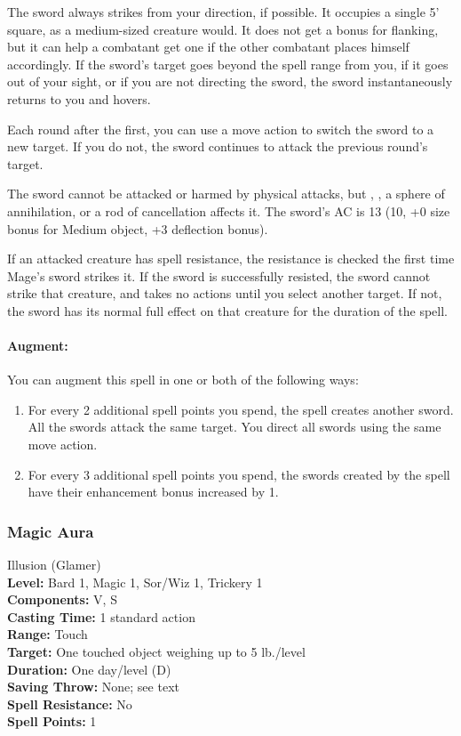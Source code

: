 The sword always strikes from your direction, if possible. It occupies a single 5' square, as a medium-sized creature would.
It does not get a bonus for flanking, but it can help a combatant get one if the other combatant places himself accordingly. 
If the sword's target goes beyond the spell range from you, if it goes out of your sight, 
or if you are not directing the sword, the sword instantaneously returns to you and hovers.

Each round after the first, you can use a move action to switch the sword to a new target. 
If you do not, the sword continues to attack the previous round's target.

The sword cannot be attacked or harmed by physical attacks, but , , a sphere of annihilation, or a rod of cancellation affects it. 
The sword's AC is 13 (10, +0 size bonus for Medium object, +3 deflection bonus).

If an attacked creature has spell resistance, the resistance is checked the first time Mage's sword strikes it. 
If the sword is successfully resisted, the sword cannot strike that creature, and takes no actions until you select another target. 
If not, the sword has its normal full effect on that creature for the duration of the spell.

\paragraph{Augment:} You can augment this spell in one or both of the following ways:
\begin{enumerate}
 \item For every 2 additional spell points you spend, the spell creates another sword. 
All the swords attack the same target. You direct all swords using the same move action.
 \item For every 3 additional spell points you spend, the swords created by the spell have their enhancement bonus increased by 1.
\end{enumerate}
\subsubsection{Magic Aura}
\label{Spell:MagicAura}
Illusion (Glamer)
\\ \textbf{Level:} Bard 1, Magic 1, Sor/Wiz 1, Trickery 1
\\ \textbf{Components:} V, S
\\ \textbf{Casting Time:} 1 standard action
\\ \textbf{Range:} Touch
\\ \textbf{Target:} One touched object weighing up to 5 lb./level
\\ \textbf{Duration:} One day/level (D)
\\ \textbf{Saving Throw:} None; see text
\\ \textbf{Spell Resistance:} No
\\ \textbf{Spell Points:} 1

